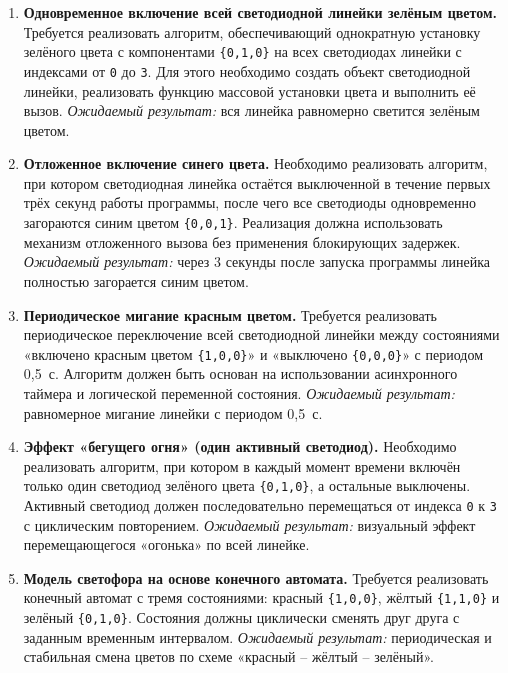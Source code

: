 \begin{enumerate}
  \item \textbf{Одновременное включение всей светодиодной линейки зелёным цветом.}  
  Требуется реализовать алгоритм, обеспечивающий однократную установку зелёного цвета с компонентами \verb|{0,1,0}| на всех светодиодах линейки с индексами от \verb|0| до \verb|3|. Для этого необходимо создать объект светодиодной линейки, реализовать функцию массовой установки цвета и выполнить её вызов.  
  \textit{Ожидаемый результат:} вся линейка равномерно светится зелёным цветом.

  \item \textbf{Отложенное включение синего цвета.}  
  Необходимо реализовать алгоритм, при котором светодиодная линейка остаётся выключенной в течение первых трёх секунд работы программы, после чего все светодиоды одновременно загораются синим цветом \verb|{0,0,1}|. Реализация должна использовать механизм отложенного вызова без применения блокирующих задержек.  
  \textit{Ожидаемый результат:} через 3 секунды после запуска программы линейка полностью загорается синим цветом.

  \item \textbf{Периодическое мигание красным цветом.}  
  Требуется реализовать периодическое переключение всей светодиодной линейки между состояниями «включено красным цветом \verb|{1,0,0}|» и «выключено \verb|{0,0,0}|» с периодом 0{,}5~с. Алгоритм должен быть основан на использовании асинхронного таймера и логической переменной состояния.  
  \textit{Ожидаемый результат:} равномерное мигание линейки с периодом 0{,}5~с.

  \item \textbf{Эффект «бегущего огня» (один активный светодиод).}  
  Необходимо реализовать алгоритм, при котором в каждый момент времени включён только один светодиод зелёного цвета \verb|{0,1,0}|, а остальные выключены. Активный светодиод должен последовательно перемещаться от индекса \verb|0| к \verb|3| с циклическим повторением.  
  \textit{Ожидаемый результат:} визуальный эффект перемещающегося «огонька» по всей линейке.

  \item \textbf{Модель светофора на основе конечного автомата.}  
  Требуется реализовать конечный автомат с тремя состояниями: красный \verb|{1,0,0}|, жёлтый \verb|{1,1,0}| и зелёный \verb|{0,1,0}|. Состояния должны циклически сменять друг друга с заданным временным интервалом.  
  \textit{Ожидаемый результат:} периодическая и стабильная смена цветов по схеме «красный -- жёлтый -- зелёный».
\end{enumerate}

